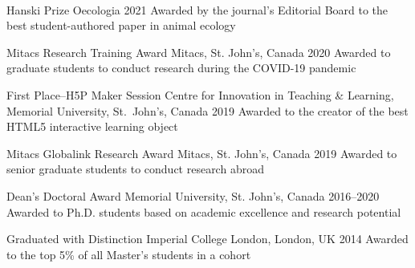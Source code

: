 \\


  \mycvhonor
    {Hanski Prize} %
    {Oecologia} %
    {2021} %
    {
    Awarded by the journal's Editorial Board to the best student-authored paper in animal ecology
    } %

  \mycvhonor
    {Mitacs Research Training Award} %
    {Mitacs, St. John's, Canada} %
    {2020} %
    {
    Awarded to graduate students to conduct research during the COVID-19 pandemic
    } %

  \mycvhonor
    {First Place--H5P Maker Session} %
    {\footnotesize Centre for Innovation in Teaching \& Learning, Memorial University, St.~John's, Canada} %
    {2019} %
    {
    Awarded to the creator of the best HTML5 interactive learning object 
    } %

  \mycvhonor
    {Mitacs Globalink Research Award} %
    {Mitacs, St. John's, Canada} %
    {2019} %
    {
     Awarded to senior graduate students to conduct research  abroad
    } %

  \mycvhonor
    {Dean's Doctoral Award} %
    {Memorial University, St. John's, Canada} %
    {2016--2020} %
    {
      Awarded to Ph.D. students based on academic excellence and research potential
    } %

  \mycvhonor
    {Graduated with Distinction} %
    {Imperial College London, London, UK} %
    {2014} %
    {
      Awarded to the top 5\% of all Master's students in a cohort
    } %

